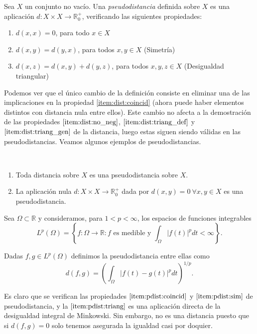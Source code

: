 \begin{definition}[Pseudodistancia]
    Sea $X$ un conjunto no vacío. Una \emph{pseudodistancia} definida sobre $X$ es una aplicación $d:X\times X \to \mathbb{R}^{+}_{0}$, verificando las siguientes propiedades:
    
    \begin{enumerate}
        \item $d(x,x)=0$, para todo $x \in X$ \label{item:pdist:coincid}
        \item $d(x,y)=d(y,x)$, para todos $x,y \in X$ (Simetría) \label{item:pdist:sim} 
        \item $d(x,z)=d(x,y)+d(y,z)$, para todos $x,y,z \in X$ (Desigualdad triangular) \label{item:pdist:triang}
    \end{enumerate}
    
\end{definition}

Podemos ver que el único cambio de la definición consiste en eliminar una de las implicaciones en la propiedad \ref{item:dist:coincid} (ahora puede haber elementos distintos con distancia nula entre ellos). Este cambio no afecta a la demostración de las propiedades $\ref{item:dist:no_neg}$, $\ref{item:dist:triang_def}$ y $\ref{item:dist:triang_gen}$ de la distancia, luego estas siguen siendo válidas en las pseudodistancias. Veamos algunos ejemplos de pseudodistancias.

\begin{example}~
    \begin{enumerate}
        \item Toda distancia sobre $X$ es una pseudodistancia sobre $X$.
        \item La aplicación nula $d:X\times X \to \mathbb{R}^+_0$ dada por $d(x,y) = 0 \ \forall x,y \in X$ es una pseudodistancia.
    \end{enumerate}
\end{example}

\begin{example}

Sea $\Omega \subset \mathbb{R}$ y consideramos, para $1 < p < \infty$, los espacios de funciones integrables 
\[L^p(\Omega)=\left\{f\colon\Omega \to \mathbb{R} \colon f \text{ es medible y } \int_{\Omega} |f(t)|^p dt < \infty \right\}.\]

Dadas $f,g \in L^p(\Omega)$ definimos la pseudodistancia entre ellas como \[d(f,g)=\left(\int_{\Omega}|f(t)-g(t)|^p dt\right)^{1/p}.\]

Es claro que se verifican las propiedades $\ref{item:pdist:coincid}$ y $\ref{item:pdist:sim}$ de pseudodistancia, y la $\ref{item:pdist:triang}$ es una aplicación directa de la desigualdad integral de Minkowski. Sin embargo, no es una distancia puesto que si $d(f,g)=0$ solo tenemos asegurada la igualdad casi por doquier.

\end{example}

